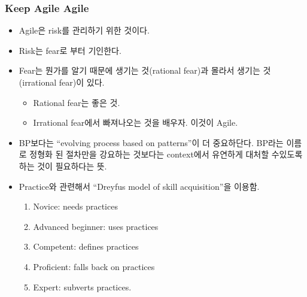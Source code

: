 \begin{frame}
\frametitle{Keep Agile Agile}

\begin{itemize}
\item Agile은 risk를 관리하기 위한 것이다.
\item Risk는 fear로 부터 기인한다.
\item Fear는 뭔가를 알기 때문에 생기는 것(rational fear)과 몰라서 생기는 
것(irrational fear)이 있다.
    \begin{itemize}
    \item Rational fear는 좋은 것.
    \item Irrational fear에서 빠져나오는 것을 배우자. 이것이 Agile.
    \end{itemize}
\item BP보다는 ``evolving process based on patterns''이 더 중요하단다.
    BP라는 이름로 정형화 된 절차만을 강요하는 것보다는 context에서 
    유연하게 대처할 수있도록 하는 것이 필요하다는 뜻.
\item Practice와 관련해서 ``Dreyfus model of skill acquisition''을 이용함.
    \begin{enumerate}
    \item Novice: needs practices
    \item Advanced beginner: uses practices
    \item Competent: defines practices
    \item Proficient: falls back on practices
    \item Expert: subverts practices.
    \end{enumerate}
\end{itemize}
\end{frame}

